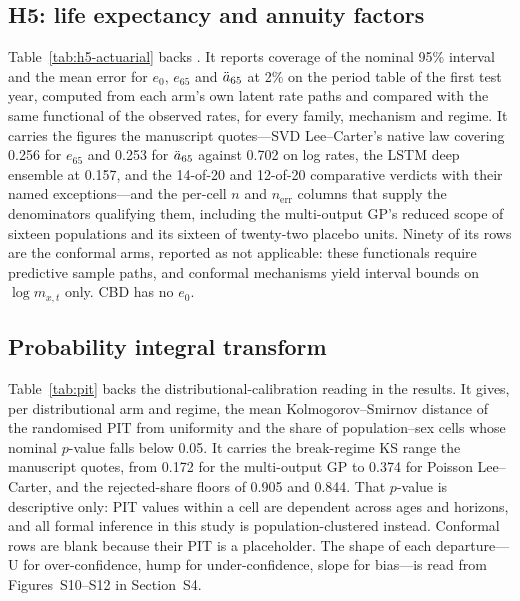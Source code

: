 
\subsection{H5: life expectancy and annuity factors}

Table~\ref{tab:h5-actuarial} backs \Hfive. It reports coverage of the nominal
95\% interval and the mean error for $e_0$, $e_{65}$ and $\ddot{a}_{65}$ at 2\% on
the period table of the first test year, computed from each arm's own latent
rate paths and compared with the same functional of the observed rates, for
every family, mechanism and regime. It carries the figures the manuscript
quotes---SVD Lee--Carter's native law covering 0.256 for $e_{65}$ and 0.253 for
$\ddot{a}_{65}$ against 0.702 on log rates, the LSTM deep ensemble at 0.157, and the
14-of-20 and 12-of-20 comparative verdicts with their named exceptions---and
the per-cell $n$ and $n_{\mathrm{err}}$ columns that supply the denominators
qualifying them, including the multi-output GP's reduced scope of sixteen
populations and its sixteen of twenty-two placebo units. Ninety of its rows are
the conformal arms, reported as not applicable: these functionals require
predictive sample paths, and conformal mechanisms yield interval bounds on
$\log m_{x,t}$ only. CBD has no $e_0$.


\subsection{Probability integral transform}

Table~\ref{tab:pit} backs the distributional-calibration reading in the
results. It gives, per distributional arm and regime, the mean
Kolmogorov--Smirnov distance of the randomised PIT from uniformity and the
share of population--sex cells whose nominal $p$-value falls below 0.05. It
carries the break-regime KS range the manuscript quotes, from 0.172 for the
multi-output GP to 0.374 for Poisson Lee--Carter, and the rejected-share floors
of 0.905 and 0.844. That $p$-value is descriptive only: PIT values within a
cell are dependent across ages and horizons, and all formal inference in this
study is population-clustered instead. Conformal rows are blank because their
PIT is a placeholder. The shape of each departure---U for over-confidence, hump
for under-confidence, slope for bias---is read from Figures~S10--S12 in
Section~S4.


